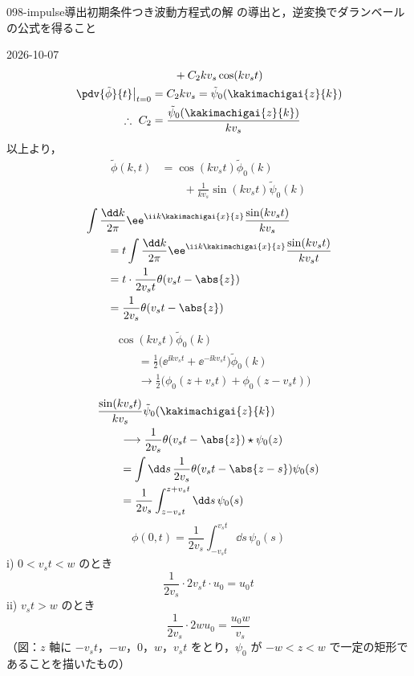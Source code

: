 \documentclass[uplatex,dvipdfmx,a4paper,11pt]{jsarticle}
\begin{document}
\begin{mondai}{098-impulse}{導出}{初期条件つき波動方程式の解  の導出と，逆変換でダランベールの公式を得ること}
\begin{kotaeutsushi}{2026-10-07}
\begin{align*}
  &\qquad+C_2kv_s\cos(kv_st)\\
  \left.\pdv{\tilde{\phi}}{t}\right|_{t=0}&=C_2kv_s=\tilde{\psi}_0(\kakimachigai{z}{k})\\
  \therefore\ C_2&=\frac{\tilde{\psi}_0(\kakimachigai{z}{k})}{kv_s}
\end{align*}
以上より，
\begin{align*}
  \tilde{\phi}(k,t)&=\cos(kv_st)\tilde{\phi}_0(k)\\
  &\qquad+\frac{1}{kv_s}\sin(kv_st)\tilde{\psi}_0(k)
\end{align*}
\begin{align*}
  &\int\frac{\dd k}{2\pi}\ee^{\ii k\kakimachigai{x}{z}}\frac{\sin(kv_st)}{kv_s}\\
  &\qquad=t\int\frac{\dd k}{2\pi}\ee^{\ii k\kakimachigai{x}{z}}\frac{\sin(kv_st)}{kv_st}\\
  &\qquad=t\cdot\frac{1}{2v_st}\theta(v_st-\abs{z})\\
  &\qquad=\frac{1}{2v_s}\theta(v_st-\abs{z})
\end{align*}
\begin{align*}
  &\cos(kv_st)\tilde{\phi}_0(k)\\
  &\qquad=\frac{1}{2}\bigl(\ee^{\ii kv_st}+\ee^{-\ii kv_st}\bigr)\tilde{\phi}_0(k)\\
  &\qquad\longrightarrow\frac{1}{2}\bigl(\phi_0(z+v_st)+\phi_0(z-v_st)\bigr)
\end{align*}
\begin{align*}
  &\frac{\sin(kv_st)}{kv_s}\tilde{\psi}_0(\kakimachigai{z}{k})\\
  &\qquad\longrightarrow\frac{1}{2v_s}\theta(v_st-\abs{z})\star\psi_0(z)\\
  &\qquad=\int\dd s\,\frac{1}{2v_s}\theta(v_st-\abs{z-s})\psi_0(s)\\
  &\qquad=\frac{1}{2v_s}\int_{z-v_st}^{z+v_st}\dd s\,\psi_0(s)
\end{align*}
\[ \phi(0,t)=\frac{1}{2v_s}\int_{-v_st}^{v_st}\dd s\,\psi_0(s) \]
i) $0<v_st<w$ のとき
\[ \frac{1}{2v_s}\cdot2v_st\cdot u_0=u_0t \]
ii) $v_st>w$ のとき
\[ \frac{1}{2v_s}\cdot2wu_0=\frac{u_0w}{v_s} \]
（図：$z$ 軸に $-v_st$，$-w$，$0$，$w$，$v_st$ をとり，$\psi_0$ が $-w<z<w$ で一定の矩形であることを描いたもの）


\end{kotaeutsushi}
\end{mondai}
\end{document}
